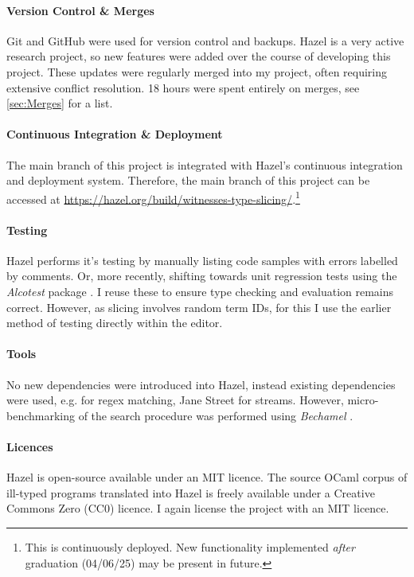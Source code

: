 \paragraph{Version Control \& Merges} Git and GitHub were used for version control and backups. Hazel is a very active research project, so new features were added over the course of developing this project. These updates were regularly merged into my project, often requiring extensive conflict resolution. 18 hours were spent entirely on merges, see \cref{sec:Merges} for a list.
\paragraph{Continuous Integration \& Deployment} The main branch of this project is integrated with Hazel's continuous integration and deployment system. Therefore, the main branch of this project can be accessed at \url{https://hazel.org/build/witnesses-type-slicing/}.\footnote{This is continuously deployed. New functionality implemented \textit{after} graduation (04/06/25) may be present in future.}
\paragraph{Testing} Hazel performs it's testing by manually listing code samples with errors labelled by comments. Or, more recently, shifting towards unit regression tests using the \textit{Alcotest} package \cite{AlcoTest}. I reuse these to ensure type checking and evaluation remains correct. However, as slicing involves random term IDs, for this I use the earlier method of testing directly within the editor.
\paragraph{Tools} No new dependencies were introduced into Hazel, instead existing dependencies were used, e.g.  \cite{JSOO} for regex matching, Jane Street  \cite{Base} for streams. However, micro-benchmarking of the search procedure was performed using \textit{Bechamel} \cite{Bechamel}.

\paragraph{Licences} Hazel is open-source available under an MIT licence. The source OCaml corpus of ill-typed programs \cite{OCamlCorpus} translated into Hazel is freely available under a Creative Commons Zero (CC0) licence. I again license the project with an MIT licence.
